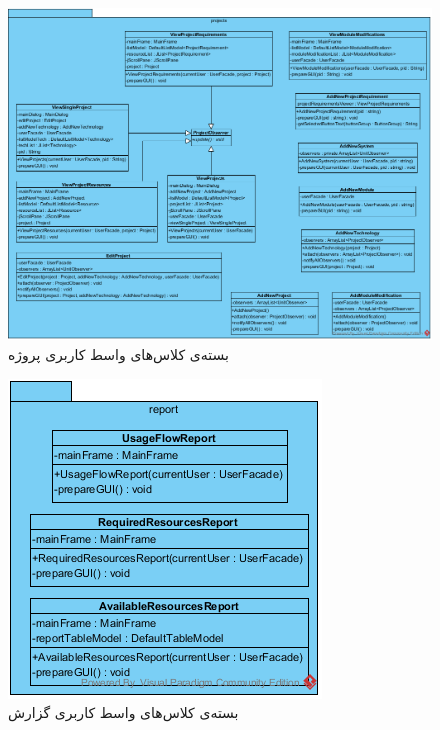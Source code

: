\begin{figure}[H]
	\centering
	\includegraphics[width=\textwidth]{img/class-design/ui/UIProject.png}

	\caption{بسته‌ی کلاس‌های واسط کاربری پروژه}
\end{figure}

\begin{figure}[H]
	\centering
	\includegraphics[width=\textwidth]{img/class-design/ui/UIReport.png}

	\caption{بسته‌ی کلاس‌های واسط کاربری گزارش}
\end{figure}

